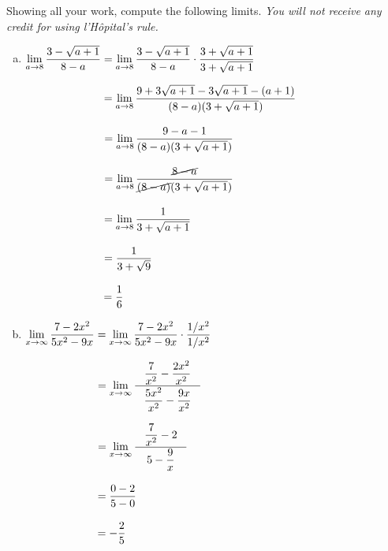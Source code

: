 \documentclass[12pt,letterpaper]{exam}
\begin{document}
\begin{questions}
\newpage
\question[20] Showing all your work, compute the following limits. {\itshape You will not receive any credit for using l'H\^opital's rule.} \par\vspace{0.3cm}
	\begin{enumerate}[(a)]
	\item $\displaystyle\lim_{a \to 8} \dfrac{3 - \sqrt{a + 1}}{8 - a}=  \lim_{a \to 8} \dfrac{3 - \sqrt{a + 1}}{8 - a} \cdot \dfrac{3 + \sqrt{a + 1}}{3 + \sqrt{a + 1}}$ \par\vspace{0.3cm}
	$\ds\phantom{\lim_{a \to 3} \dfrac{\sqrt{a + 1} - 2}{a - 3}}= \lim_{a \to 8} \dfrac{9 + 3 \sqrt{a + 1} - 3\sqrt{a + 1} - (a + 1)}{(8 - a)(3 + \sqrt{a + 1})}$ \par\vspace{0.3cm}
	$\ds\phantom{\lim_{a \to 3} \dfrac{\sqrt{a + 1} - 2}{a - 3}}= \lim_{a \to 8} \dfrac{9 - a - 1}{(8 - a)(3 + \sqrt{a + 1})}$ \par\vspace{0.3cm}
	$\ds\phantom{\lim_{a \to 3} \dfrac{\sqrt{a + 1} - 2}{a - 3}}= \lim_{a \to 8} \dfrac{\cancel{8 - a}}{\cancel{(8 - a)}(3 + \sqrt{a + 1})}$ \par\vspace{0.3cm}
	$\ds\phantom{\lim_{a \to 3} \dfrac{\sqrt{a + 1} - 2}{a - 3}}= \lim_{a \to 8} \dfrac{1}{3 + \sqrt{a + 1}}$ \par\vspace{0.3cm}
	$\ds\phantom{\lim_{a \to 3} \dfrac{\sqrt{a + 1} - 2}{a - 3}}= \dfrac{1}{3 + \sqrt{9}}$ \par\vspace{0.3cm}
	$\ds\phantom{\lim_{a \to 3} \dfrac{\sqrt{a + 1} - 2}{a - 3}}= \dfrac{1}{6}$ \par\vspace{0.72cm}
	
	\item $\displaystyle\lim_{x \to \infty} \dfrac{7 - 2x^2}{5x^2 - 9x}= \lim_{x \to \infty} \dfrac{7 - 2x^2}{5x^2 - 9x} \cdot \dfrac{1/x^2}{1/x^2}$ \par\vspace{0.3cm}
	$\ds\phantom{\lim_{x \to \infty} \dfrac{3x^2 - 4}{5x - 7x^2}}= \lim_{x \to \infty} \dfrac{\;\;\;\dfrac{7}{x^2} - \dfrac{2x^2}{x^2}\;\;\;}{\dfrac{5x^2}{x^2} - \dfrac{9x}{x^2}}$ \par\vspace{0.3cm}
	$\ds\phantom{\lim_{x \to \infty} \dfrac{3x^2 - 4}{5x - 7x^2}}= \lim_{x \to \infty} \dfrac{\;\;\;\dfrac{7}{x^2} - 2\;\;\;}{5 - \dfrac{9}{x}}$ \par\vspace{0.3cm} 
	$\ds\phantom{\lim_{x \to \infty} \dfrac{3x^2 - 4}{5x - 7x^2}}= \dfrac{0 - 2}{5 - 0}$ \par\vspace{0.3cm}
	$\ds\phantom{\lim_{x \to \infty} \dfrac{3x^2 - 4}{5x - 7x^2}}= -\dfrac{2}{5}$ \vfill
	

\end{enumerate}
\end{questions}
\end{document}
